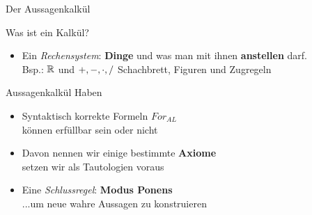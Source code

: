 \begin{frame}{Der Aussagenkalkül}
	\begin{block}{Was ist ein Kalkül?}
		\begin{itemize}
			\item Ein \emph{Rechensystem}: \; \textbf{Dinge} und was man mit ihnen \textbf{anstellen} darf. \\
			      Bsp.: \quad $\mathbb{R}$ und $+, -, \cdot, /$ \qquad Schachbrett, Figuren und Zugregeln
		\end{itemize}
	\end{block}
	\pause
	\begin{block}{Aussagenkalkül}
		Haben
		\begin{itemize}
			\item Syntaktisch korrekte Formeln $For_{AL}$ \\
			      \impl können erfüllbar sein oder nicht
			\item Davon nennen wir einige bestimmte \textbf{Axiome} \\
			      \impl setzen wir als Tautologien voraus
			\item Eine \emph{Schlussregel}: \textbf{Modus Ponens} \\
			      ...um neue wahre Aussagen zu konstruieren
		\end{itemize}
	\end{block}
\end{frame}



